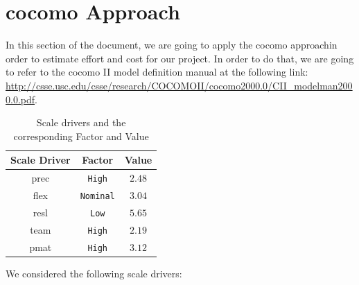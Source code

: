 \section{\acs{cocomo} Approach} \label{sec:cocomo}

In this section of the document, we are going to apply the \acs{cocomo} approachin order to estimate effort and cost for our project.
In order to do that, we are going to refer to the \acs{cocomo} II model definition manual at the following link: \url {http://csse.usc.edu/csse/research/COCOMOII/cocomo2000.0/CII_modelman2000.0.pdf}.

\begin{table}[htbp]
\begin{center}
\begin{tabular}[t]{ccc}

\hline
\textbf{Scale Driver} & \textbf{Factor} & \textbf{Value} \\
\hline
\acs{prec} & \texttt{High} &  $2.48$\\
\hline
\acs{flex} & \texttt{Nominal} & $3.04$\\
\hline
\acs{resl}&  \texttt{Low} &  $5.65$\\
\hline
\acs{team} & \texttt{High} &  $2.19$\\
\hline
\acs{pmat} & \texttt{High} & $3.12$ \\
\hline

\end{tabular}
\caption{Scale drivers and the corresponding Factor and Value}
\end{center}
\end{table}

We considered the following scale drivers:

